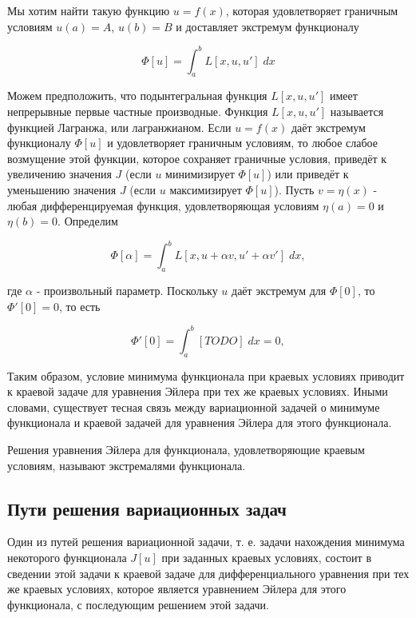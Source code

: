 \documentclass{article}
\begin{document}
Мы хотим найти такую функцию $u = f(x)$, которая удовлетворяет граничным условиям $u(a) = A$, $u(b) = B$ и доставляет экстремум функционалу

\begin{displaymath}
	\Phi[u] = \int_{a}^{b} L[x, u, u'] \; dx
\end{displaymath}

Можем предположить, что подынтегральная функция $L[x, u, u']$ имеет непрерывные первые частные производные. Функция $L[x, u, u']$ называется функцией Лагранжа, или лагранжианом. Если $u = f(x)$ даёт экстремум функционалу $\Phi[u]$ и удовлетворяет граничным условиям, то любое слабое возмущение этой функции, которое сохраняет граничные условия, приведёт к увеличению значения $J$ (если $u$ минимизирует $\Phi[u]$) или приведёт к уменьшению значения $J$ (если $u$ максимизирует $\Phi[u]$).
Пусть $v = \eta(x)$ - любая дифференцируемая функция, удовлетворяющая условиям $\eta(a) = 0$ и $\eta(b) = 0$.
Определим

\begin{displaymath}
	\Phi[\alpha] = \int_{a}^{b} L[x, u + \alpha v, u' +  \alpha v'] \; dx,
\end{displaymath}

где $\alpha$ - произвольный параметр.
\noindent  Поскольку $u$ даёт экстремум для $\Phi[0]$, то $\Phi'[0] = 0$, то есть

\begin{displaymath}
	\Phi'[0] = \int_{a}^{b} [TODO] \; dx = 0,
\end{displaymath}


Таким образом, условие минимума функционала при краевых условиях приводит к краевой задаче для уравнения Эйлера при тех же краевых условиях. Иными словами, существует тесная связь между вариационной задачей о минимуме функционала и краевой задачей для уравнения Эйлера для этого функционала.

\begin{warn}[Важно!]
	Решения уравнения Эйлера для функционала, удовлетворяющие краевым условиям, называют экстремалями функционала.
\end{warn}


\subsection{Пути решения вариационных задач}

Один из путей решения вариационной задачи, т. е. задачи нахождения минимума некоторого функционала $J[u]$ при заданных краевых условиях, состоит в сведении этой задачи к краевой задаче для дифференциального уравнения при тех же краевых условиях, которое является уравнением Эйлера для этого функционала, с последующим решением этой задачи.
\end{document}
